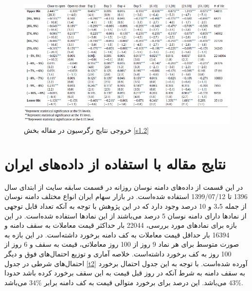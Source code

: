 \documentclass[12pt]{article}
\begin{document}
\begin{landscape}
\begin{figure}[htbp]
\includegraphics[width=1\columnwidth]{Table1.png}
\caption{خروجی نتایج رگرسیون در مقاله بخش \ref {s1.2}}
\label{g1}
\end{figure}
\end{landscape}
\FloatBarrier


\section{نتایج مقاله با استفاده از داده‌های ایران}
در این قسمت از داده‌های دامنه نوسان روزانه در قسمت سابقه سایت 
از ابتدای سال 1396 تا 1399/07/12 استفاده شده‌است.
در بازار سهام ایران انواع مختلف دامنه نوسان از جمله 3،5 و 10 درصد  وجود دارد که در این پژوهش با توجه به آنکه تعداد قابل توجهی از نماد‌ها دارای دامنه نوسان 5 درصد می‌باشند از این نماد‌ها استفاده شده‌است.
 در این بازه برای نماد‌های مورد بررسی، 22044 بار حداکثر قیمت معاملات به سقف دامنه و 16394 بار حداقل قیمت معاملات به کف دامنه برخورد داشته‌است. 
در این بازه به صورت متوسط برای هر نماد 9 روز از 100 روز معاملاتی، قیمت به سقف و 6 روز از 100 روز به کف برخورد داشته‌است. 
خلاصه آماری و توزیع احتمال‌های فوق و دیگر احتمال‌های شرطی در جدول 
\ref{t2}
آورده شده‌است.
با توجه به این جدول احتمال برخورد به سقف دامنه به شرط آنکه در روز قبل قیمت به این سقف برخورد کرده باشد حدودا 
$ 43\% $
می‌باشد. این درصد برای برخورد متوالی قیمت به کف دامنه برابر 
$ 34 \% $
می‌باشد.
\end{document}

